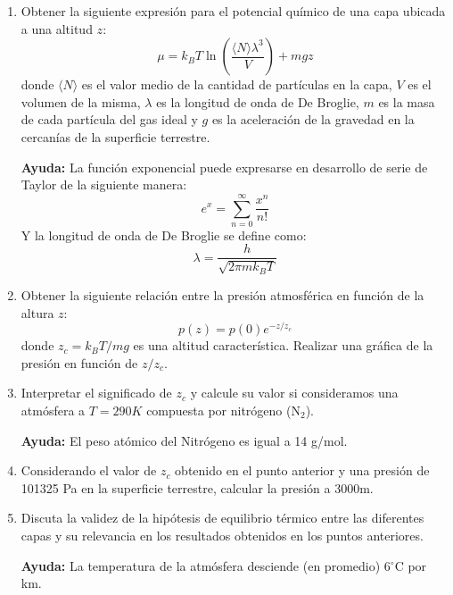 \documentclass[a4paper,11pt]{article}
\begin{document}
\begin{enumerate}[label=(\alph*),
                  leftmargin=2\parindent,
                  rightmargin=2\parindent]

    \item{Obtener la siguiente expresión para el potencial químico de 
          una capa ubicada a una altitud $z$:
          $$ \mu =
          k_B T \ln \left( \frac{\langle N \rangle \lambda^3}{V} \right)
          + mgz $$
          donde $\langle N \rangle$ es el valor medio de la cantidad de 
          partículas en la capa, $V$ es el volumen de la misma, 
          $\lambda$ es la longitud de onda de De Broglie, $m$ es la 
          masa de cada partícula del gas ideal y $g$ es la aceleración 
          de la gravedad en la cercanías de la superficie terrestre.
          }

    {\small
    \textbf{Ayuda:}
    La función exponencial puede expresarse en desarrollo de serie de 
    Taylor de la siguiente manera:
    $$ e^x = \sum_{n=0}^\infty \frac{x^n}{n!} $$
    Y la longitud de onda de De Broglie se define como:
    $$ \lambda = \frac{h}{\sqrt{2\pi m k_B T}} $$
    }

    \item{Obtener la siguiente relación entre la presión atmosférica 
          en función de la altura $z$:
          $$ p(z) = p(0) e^{-z/z_c} $$
          donde $z_c = k_B T / mg$ es una altitud característica.
          Realizar una gráfica de la presión en función de $z/z_c$.
          }
    
    \item{Interpretar el significado de $z_c$ y calcule su valor si 
          consideramos una atmósfera a $T = 290 K$ compuesta por 
          nitrógeno (N$_2$).}

    {\small
    \textbf{Ayuda:}
    El peso atómico del Nitrógeno es igual a 14 g/mol.
    }

    \item{Considerando el valor de $z_c$ obtenido en el punto anterior 
          y una presión de 101325 Pa en la superficie terrestre,
          calcular la presión a 3000m.}

    \item{Discuta la validez de la hipótesis de equilibrio térmico 
          entre las diferentes capas y su relevancia en los resultados 
          obtenidos en los puntos anteriores.}
    
    {\small
    \textbf{Ayuda:}
    La temperatura de la atmósfera desciende (en promedio) 6$^\circ$C 
    por km.
    }

\end{enumerate}
\end{document}
